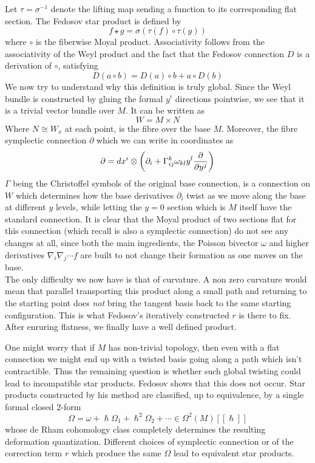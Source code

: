 \documentclass[
  12pt,
  a4paper, oneside
]{report}
\renewcommand{\hbar}{\hslash}
\theoremstyle{bolddef}
\theoremstyle{remark}
\numberwithin{equation}{chapter}
\begin{document}
Let $\tau = \sigma^{-1}$ denote the lifting map sending a function to
its corresponding flat section. The Fedosov star product is defined by
\[
f \star g =
\sigma\left(\tau(f)\circ\tau(g)\right)
\]
where $\circ$ is the fiberwise Moyal product. Associativity follows from the associativity of the Weyl product and
the fact that the Fedosov connection $D$ is a derivation of $\circ$, satisfying 
$$
D(a \circ b) = D(a) \circ b + a \circ D(b)
$$
We now try to understand why this definition is truly global. Since the Weyl bundle is constructed by gluing the formal $y^{i}$ directions pointwise, we see that it is a trivial vector bundle over $M$. It can be written as 
$$
W = M \times N
$$
Where $N \cong W_{x}$ at each point, is the fibre over the base $M$. Moreover, the fibre symplectic connection $\partial$ which we can write in coordinates as 
$$
\partial = dx^{i} \otimes \left( \partial_{i} + \Gamma^{k}_{ij}\omega_{kl}y^{l}\pdv{}{y^{j}} \right)
$$
 $\Gamma$ being the Christoffel symbols of the original base connection, is a connection on $W$ which determines how the base derivatives $\partial_{i}$ twist as we move along the base at different $y$ levels, while letting the $y=0$ section which is $M$ itself have the standard connection. It is clear that the Moyal product of two sections flat for this connection (which recall is also a symplectic connection) do not see any changes at all, since both the main ingredients, the Poisson bivector $\omega$ and higher derivatives $\nabla_{i}\nabla_{j} \cdots f$ are built to not change their formation as one moves on the base. \\
 The only difficulty we now have is that of curvature. A non zero curvature would mean that parallel transporting this product along a small path and returning to the starting point does \textit{not} bring the tangent basis back to the same starting configuration. This is what Fedosov's iteratively constructed $r$ is there to fix. After enruring flatness, we finally have a well defined product. 
 \bigskip
 
 One might worry that if $M$ has non-trivial topology, then even with a flat connection we might end up with a twisted basis going along a path which isn't contractible. Thus the remaining question is whether such global twisting could lead to incompatible star products. 
Fedosov shows that this does not occur. Star products constructed by his method are classified, up 
to equivalence, by a single formal closed $2$-form
\begin{equation}
\Omega = \omega + \hbar \Omega_1 + \hbar^2 \Omega_2 + \cdots \in \Omega^2(M)[[\hbar]]
\end{equation}
whose de Rham cohomology class completely determines the resulting deformation quantization. 
Different choices of symplectic connection or of the correction term $r$ which produce the same 
$\Omega$ lead to equivalent star products.
\end{document}
